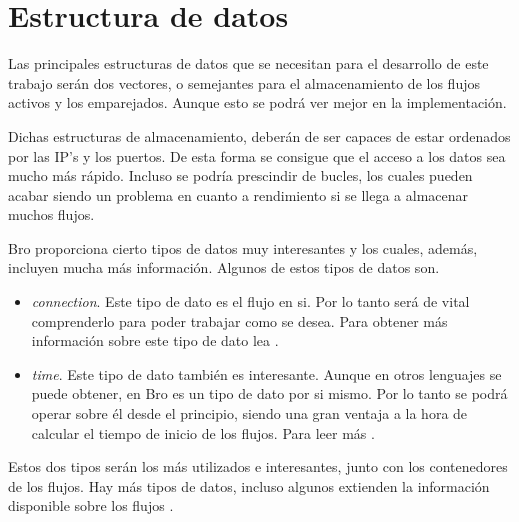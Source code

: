 \section{Estructura de datos}

Las principales estructuras de datos que se necesitan para el desarrollo de este trabajo serán dos vectores, o semejantes para el almacenamiento de los flujos activos y los emparejados. Aunque esto se podrá ver mejor en la implementación.

\intro Dichas estructuras de almacenamiento, deberán de ser capaces de estar ordenados por las IP's y los puertos. De esta forma se consigue que el acceso a los datos sea mucho más rápido. Incluso se podría prescindir de bucles, los cuales pueden acabar siendo un problema en cuanto a rendimiento si se llega a almacenar muchos flujos.

\intro Bro proporciona cierto tipos de datos muy interesantes y los cuales, además, incluyen mucha más información. 
Algunos de estos tipos de datos son. 
\begin{itemize}
\item \textit{connection}. \intro Este tipo de dato es el flujo en si. Por lo tanto será de vital comprenderlo para poder trabajar como se desea. Para obtener más información sobre este tipo de dato lea \cite{connectiontype}.
\item \textit{time}. \intro Este tipo de dato también es interesante. Aunque en otros lenguajes se puede obtener, en Bro es un tipo de dato por si mismo. Por lo tanto se podrá operar sobre él desde el principio, siendo una gran ventaja a la hora de calcular el tiempo de inicio de los flujos. Para leer más \cite{timetype}. 
\end{itemize}

\intro Estos dos tipos serán los más utilizados e interesantes, junto con los contenedores de los flujos. Hay más tipos de datos, incluso algunos extienden la información disponible sobre los flujos \cite{conntype}.

